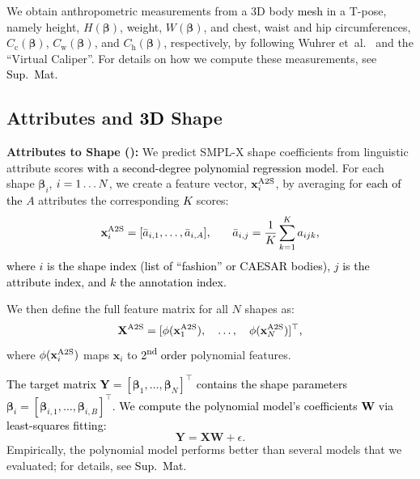 \documentclass[10pt,twocolumn,letterpaper]{article}
\newcommand{\zheading}[1]{\textbf{#1:}}
\newcommand{\TODO}[1]{\xspace{\color{red} #1}\xspace}
\renewcommand{\TODO}[1]{\xspace{\color{black} #1}\xspace}
\newcommand{\vcaliper}{``Virtual Caliper''\xspace}
\newcommand{\virtualcaliper}{\vcaliper}
\newcommand{\AtoS}{\text{\mbox{A2S}}\xspace}
\newcommand{\polynomialweights}{W}
\newcommand{\numattr}{K}
\newcommand{\lineartarget}{\mathbf{Y}}
\newcommand{\threeD}{3D\xspace}
\newcommand{\smplx}{\mbox{SMPL-X}\xspace}
\newcommand{\smplX}{\smplx}
\newcommand{\caesar}{\mbox{CAESAR}\xspace}
\newcommand{\supmat}{{\mbox{\textcolor{black}{Sup.~Mat.}}}\xspace}
\newcommand{\shape}{\bm{\beta}}
\renewcommand{\etal}{\mbox{et al.}\xspace}
\newcommand{\height}{H}
\newcommand{\weight}{W}
\newcommand{\heightArg}{\height(\shape)}
\newcommand{\weightArg}{\weight(\shape)}
\newcommand{\chestCirc}{C_{\text{c}}}
\newcommand{\waistCirc}{C_{\text{w}}}
\newcommand{\hipsCirc}{C_{\text{h}}}
\newcommand{\chestCircArg}{\chestCirc(\shape)}
\newcommand{\waistCircArg}{\waistCirc(\shape)}
\newcommand{\hipsCircArg}{\hipsCirc(\shape)}
\newcommand{\cameraready}[1]{\textcolor{Fuchsia}{{#1}}\xspace}
\renewcommand{\cameraready}[1]{\textcolor{black}{{#1}}\xspace}
\newcommand{\colorTERM}{blue}
\renewcommand{\colorTERM}{black}
\newcommand{\measurements}[0]{{\color{\colorTERM}anthropometric measurements}\xspace}
\newcommand{\scores}[0]{{scores}\xspace}
\newcommand{\linguisticattributescores}[0]{{\color{\colorTERM}linguistic attribute \scores}\xspace}
\begin{document}
We obtain \measurements from a \threeD body \cameraready{mesh} in a \mbox{T-pose},
namely 
height, $\heightArg$, weight, $\weightArg$,
and chest, waist and hip circumferences, $\chestCircArg$, $\waistCircArg$,
and $\hipsCircArg$, respectively,
by following 
Wuhrer \etal~\cite{wuhrer2013estimating} and the
\virtualcaliper \cite{pujades2019virtual}.
For details on how we compute these measurements, see \supmat


\subsection{Attributes and \cameraready{\threeD} Shape}  


\zheading{Attributes to Shape (\textbf{\AtoS})}
We predict \smplX shape coefficients from \linguisticattributescores
\cameraready{with a second-degree polynomial regression model.}
For each shape $\shape_i$, $i = 1 \dots \TODO{N}$, we create a feature vector,
\TODO{$\mathbf{x}_i^{\AtoS}$}, by averaging 
for \cameraready{each of the} $A$ attributes 
the corresponding \cameraready{$\numattr$} \scores:
\begin{equation}
\cameraready{
    \TODO{\TODO{\mathbf{x}}_i^{\AtoS}}    = [\bar{a}_{i,1}, \dots, \bar{a}_{i,A}]
    \text{,}    
    \quad\quad
    \bar{a}_{i,j}   = \frac{1}{\numattr} \sum_{k=1}^{\numattr} a_{ijk}
    \text{,}
}
\end{equation}
\cameraready{where 
$i$ is the shape        index (list of ``fashion'' or \caesar bodies), 
$j$ is the attribute    index, and 
$k$    the annotation   index.}

\noindent
We then define the full feature matrix for all $N$ shapes as:
\begin{equation}
    \cameraready{\mathbf{X}^{\AtoS}} =    [
                        \phi(\TODO{\mathbf{x}}_1^{\AtoS}),  \quad
                        \dots,               \quad
                        \phi(\TODO{\mathbf{x}}_N^{\AtoS}) 
                    ]^\top
                    \text{,}
\end{equation}
where $\phi(\mathbf{x}_i^{\AtoS})$ maps $\mathbf{x}_i$ to
\cameraready{2\textsuperscript{nd} order}
polynomial features.

\noindent
\cameraready{The target matrix $\lineartarget   = [\shape_1, \dots, \shape_N]^\top$ contains 
the shape parameters 
$\bm{\shape}_i = [\shape_{i,1}, \dots, \shape_{i,B}]^\top$. 
We compute 
the polynomial model's coefficients $\bm{\polynomialweights}$ 
via least-squares fitting:}
\begin{equation}
    \lineartarget = \mathbf{X\polynomialweights} + \epsilon
    \text{.}
\end{equation}
Empirically, the polynomial model performs better than several models that we evaluated; 
for details, see \supmat 
\end{document}
